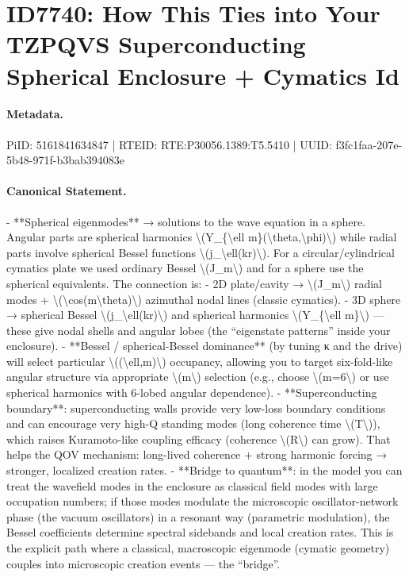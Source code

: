\section*{ID7740: How This Ties into Your TZPQVS Superconducting Spherical Enclosure + Cymatics Id}
\paragraph{Metadata.}
PiID: 5161841634847 | RTEID: RTE:P30056.1389:T5.5410 | UUID: f3fc1faa-207e-5b48-971f-b3bab394083e

\paragraph{Canonical Statement.}
- **Spherical eigenmodes** → solutions to the wave equation in a sphere. Angular parts are spherical harmonics \textbackslash{}(Y\_\{\textbackslash{}ell m\}(\textbackslash{}theta,\textbackslash{}phi)\textbackslash{}) while radial parts involve spherical Bessel functions \textbackslash{}(j\_\textbackslash{}ell(kr)\textbackslash{}). For a circular/cylindrical cymatics plate we used ordinary Bessel \textbackslash{}(J\_m\textbackslash{}) and for a sphere use the spherical equivalents. The connection is: - 2D plate/cavity → \textbackslash{}(J\_m\textbackslash{}) radial modes + \textbackslash{}(\textbackslash{}cos(m\textbackslash{}theta)\textbackslash{}) azimuthal nodal lines (classic cymatics). - 3D sphere → spherical Bessel \textbackslash{}(j\_\textbackslash{}ell(kr)\textbackslash{}) and spherical harmonics \textbackslash{}(Y\_\{\textbackslash{}ell m\}\textbackslash{}) — these give nodal shells and angular lobes (the “eigenstate patterns” inside your enclosure). - **Bessel / spherical-Bessel dominance** (by tuning κ and the drive) will select particular \textbackslash{}((\textbackslash{}ell,m)\textbackslash{}) occupancy, allowing you to target six-fold-like angular structure via appropriate \textbackslash{}(m\textbackslash{}) selection (e.g., choose \textbackslash{}(m=6\textbackslash{}) or use spherical harmonics with 6-lobed angular dependence). - **Superconducting boundary**: superconducting walls provide very low-loss boundary conditions and can encourage very high-Q standing modes (long coherence time \textbackslash{}(T\textbackslash{})), which raises Kuramoto-like coupling efficacy (coherence \textbackslash{}(R\textbackslash{}) can grow). That helps the QOV mechanism: long-lived coherence + strong harmonic forcing → stronger, localized creation rates. - **Bridge to quantum**: in the model you can treat the wavefield modes in the enclosure as classical field modes with large occupation numbers; if those modes modulate the microscopic oscillator-network phase (the vacuum oscillators) in a resonant way (parametric modulation), the Bessel coefficients determine spectral sidebands and local creation rates. This is the explicit path where a classical, macroscopic eigenmode (cymatic geometry) couples into microscopic creation events — the “bridge”.

